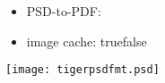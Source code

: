 \documentclass[luatex]{article}%
\begin{document}
\begin{itemize}
\makeatletter
\item PSD-to-PDF: \@gfxpsd@psdtopdf

\item image cache: \if@gfxpsd@imagecache true\else false\fi
\makeatother
\end{itemize}

\texttt{[image: tigerpsdfmt.psd]}
\end{document}
